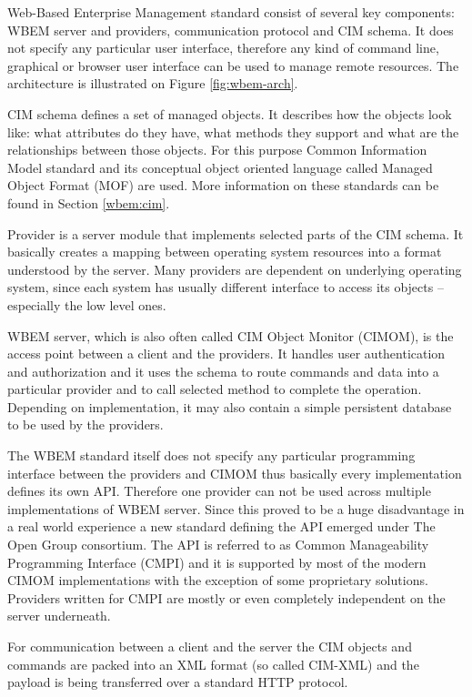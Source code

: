 Web-Based Enterprise Management standard consist of several key components:
WBEM server and providers, communication protocol and CIM schema. It does not
specify any particular user interface, therefore any kind of command line,
graphical or browser user interface can be used to manage remote resources. The
architecture is illustrated on Figure \ref{fig:wbem-arch}.

CIM schema defines a set of managed objects. It describes how the objects look
like: what attributes do they have, what methods they support and what are the
relationships between those objects. For this purpose Common Information Model
standard and its conceptual object oriented language called Managed Object
Format (MOF) are used. More information on these standards can be found in
Section \ref{wbem:cim}.

Provider is a server module that implements selected parts of the CIM schema. It
basically creates a mapping between operating system resources into a format
understood by the server. Many providers are dependent on underlying
operating system, since each system has usually different interface to access
its objects -- especially the low level ones.

WBEM server, which is also often called CIM Object Monitor (CIMOM), is the
access point between a client and the providers. It handles user authentication
and authorization and it uses the schema to route commands and data into a
particular provider and to call selected method to complete the operation.
Depending on implementation, it may also contain a simple persistent database to
be used by the providers.

The WBEM standard itself does not specify any particular programming interface
between the providers and CIMOM thus basically every implementation defines its
own API. Therefore one provider can not be used across multiple implementations
of WBEM server. Since this proved to be a huge disadvantage in a real world
experience a new standard defining the API emerged under The Open Group
consortium. The API is referred to as Common Manageability Programming Interface
(CMPI) and it is supported by most of the modern CIMOM implementations with the
exception of some proprietary solutions. Providers written for CMPI are mostly
or even completely independent on the server underneath.

For communication between a client and the server the CIM objects and commands
are packed into an XML format (so called CIM-XML) and the payload is being
transferred over a standard HTTP protocol.

